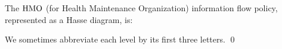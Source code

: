 \begin{example}
\label{ex-hasse-diagram-HMO}

The \(\mathrm{HMO}\) (for Health Maintenance Organization) information flow policy, represented as a Hasse diagram, is:

{
\centering


}
We sometimes abbreviate each level by its first three letters. \qed
\end{example}


%
%

